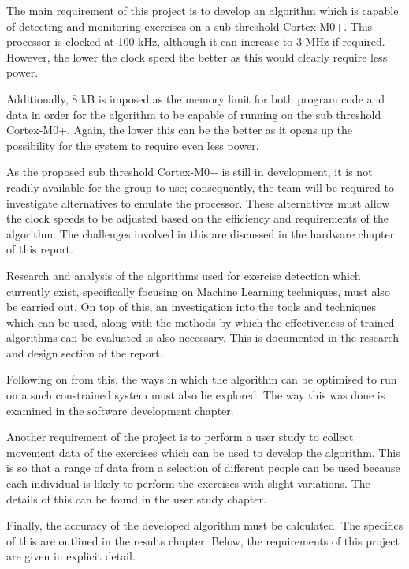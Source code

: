
The main requirement of this project is to develop an algorithm which is capable of detecting and monitoring exercises on a sub threshold Cortex-M0+. This processor is clocked at 100 kHz, although it can increase to 3 MHz if required. However, the lower the clock speed the better as this would clearly require less power.

Additionally, 8 kB is imposed as the memory limit for both program code and data in order for the algorithm to be capable of running on the sub threshold Cortex-M0+. Again, the lower this can be the better as it opens up the possibility for the system to require even less power.

As the proposed sub threshold Cortex-M0+ is still in development, it is not readily available for the group to use; consequently, the team will be required to investigate alternatives to emulate the processor. These alternatives must allow the clock speeds to be adjusted based on the eﬃciency and requirements of the algorithm. The challenges involved in this are discussed in the hardware chapter of this report.

Research and analysis of the algorithms used for exercise detection which currently exist, speciﬁcally focusing on Machine Learning techniques, must also be carried out. On top of this, an investigation into the tools and techniques which can be used, along with the methods by which the eﬀectiveness of trained algorithms can be evaluated is also necessary. This is documented in the research and design section of the report.

Following on from this, the ways in which the algorithm can be optimised to run on a such constrained system must also be explored. The way this was done is examined in the software development chapter.

Another requirement of the project is to perform a user study to collect movement data of the exercises which can be used to develop the algorithm. This is so that a range of data from a selection of diﬀerent people can be used because each individual is likely to perform the exercises with slight variations. The details of this can be found in the user study chapter.

Finally, the accuracy of the developed algorithm must be calculated. The specifics of this are outlined in the results chapter.
Below, the requirements of this project are given in explicit detail.

